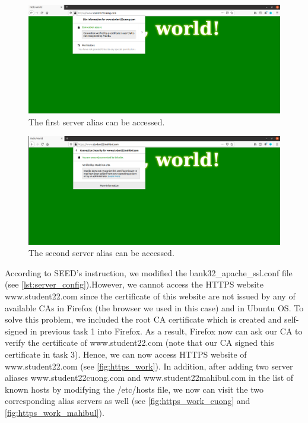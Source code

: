 \begin{figure}
    \centering
    \includegraphics[height=\textheight,width=\textwidth,keepaspectratio]
    {figures/https_work_cuong.png}
    \caption{The first server alias can be accessed.}
    \label{fig:https_work_cuong}
\end{figure}

\begin{figure}
    \centering
    \includegraphics[height=\textheight,width=\textwidth,keepaspectratio]
    {figures/https_work_mahibul.png}
    \caption{The second server alias can be accessed.}
    \label{fig:https_work_mahibul}
\end{figure}

According to SEED's instruction, we modified the {\selectfont
bank32\_apache\_ssl.conf} file (see \autoref{lst:server_config}).However, we
cannot access the HTTPS website {\selectfont
www.student22.com} since the certificate of this website are not issued by
any of available CAs in Firefox (the browser we used in this case) and in Ubuntu OS.
To solve this problem, we included the root CA certificate which is created and
self-signed in previous task 1 into Firefox. As a result, Firefox now can ask
our CA to verify the certificate of {\selectfont
www.student22.com} (note that our CA signed this certificate in task 3). Hence,
we can now access HTTPS website of {\selectfont
www.student22.com} (see \autoref{fig:https_work}). In addition, after adding two
server aliases {\selectfont www.student22cuong.com} and
{\selectfont www.student22mahibul.com} in the list of known hosts
by modifying the {\selectfont /etc/hosts} file, we now can visit
the two corresponding alias servers as well (see \autoref{fig:https_work_cuong}
and \autoref{fig:https_work_mahibul}).